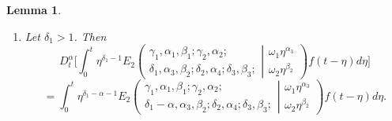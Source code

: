 \documentclass{amsart}
\numberwithin{equation}{section}
\newtheorem{lem}[thm]{Lemma}
\begin{document}
\begin{lem}
\begin{enumerate}
\begin{equation}
    \end{equation}
    \item  Let $\delta_1>1$. Then
    \begin{equation*}
    D_t^\alpha \bigg[\int_0^t \eta^{\delta_1-1} E_2\left(\begin{array}{c}
\gamma_1,\alpha_1, \beta_1 ; \gamma_2, \alpha_2 ; \\
\delta_1, \alpha_3, \beta_2 ;\delta_2, \alpha_4; \delta_3, \beta_3 ; 
\end{array} \left| 
\begin{array}{c}
\omega_1 \eta^{\alpha_3} \\
\omega_2 \eta^{\beta_2} 
\end{array} 
\right.
\right)f(t-\eta) d\eta \bigg] 
\end{equation*}
\begin{equation}\label{jumaeva:eq:10}
=\int_0^t \eta^{\delta_1-\alpha-1} E_2\left(\begin{array}{c}
\gamma_1,\alpha_1, \beta_1 ; \gamma_2, \alpha_2 ; \\
\delta_1-\alpha, \alpha_3, \beta_2 ;\delta_2, \alpha_4; \delta_3, \beta_3 ; 
\end{array} \left| 
\begin{array}{c}
\omega_1 \eta^{\alpha_3} \\
\omega_2 \eta^{\beta_2} 
\end{array} 
\right.
\right) f(t-\eta) d\eta.
\end{equation}
\end{enumerate}\label{jumaeva:lem:5} 
\end{lem} 
\end{document}
